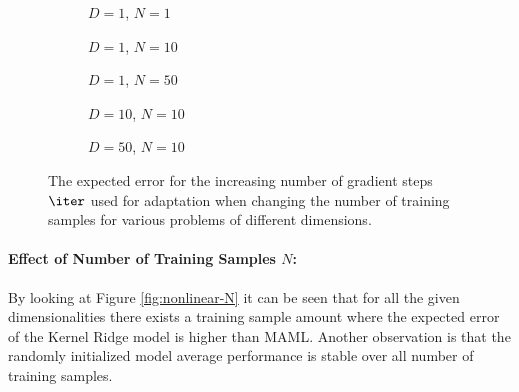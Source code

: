 \begin{figure}[!htb]
  \centering
    \begin{subfigure}{0.32\textwidth}
      \centering
      \caption{$D=1$, $N=1$}
      \label{fig:nonlinear-n_iter-N-1-D-1}
    \end{subfigure}
    \begin{subfigure}{0.32\textwidth}
      \centering
      \caption{$D=1$, $N=10$}
      \label{fig:nonlinear-n_iter-N-10-D-1}
    \end{subfigure}
    \begin{subfigure}{0.32\textwidth}
      \centering
      \caption{$D=1$, $N=50$}
      \label{fig:nonlinear-n_iter-N-50-D-1}
    \end{subfigure}

    \begin{subfigure}{0.32\textwidth}
      \centering
      \caption{$D=10$, $N=10$}
      \label{fig:nonlinear-n_iter-N-10-D-10}
    \end{subfigure}
    \begin{subfigure}{0.32\textwidth}
      \centering
      \caption{$D=50$, $N=10$}
      \label{fig:nonlinear-n_iter-N-10-D-50}
    \end{subfigure}  
  \caption{The expected error for the increasing number of gradient steps $\iter$ used for adaptation when changing the number of training samples for various problems of different dimensions.}
  \label{fig:nonlinear-n_iter}
\end{figure}


\paragraph{Effect of Number of Training Samples $N$:} By looking at Figure \ref{fig:nonlinear-N} it can be seen that for all the given dimensionalities there exists a training sample amount where the expected error of the Kernel Ridge model is higher than MAML. Another observation is that the randomly initialized model average performance is stable over all number of training samples. 

